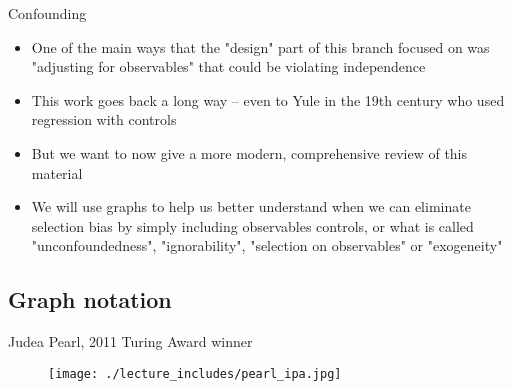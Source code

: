 \documentclass{beamer}
\begin{document}
\begin{frame}{Confounding}

\begin{itemize}

\item One of the main ways that the "design" part of this branch focused on was "adjusting for observables" that could be violating independence
\item This work goes back a long way -- even to Yule in the 19th century who used regression with controls
\item But we want to now give a more modern, comprehensive review of this material
\item We will use graphs to help us better understand when we can eliminate selection bias by simply including observables controls, or what is called "unconfoundedness", "ignorability", "selection on observables" or "exogeneity"

\end{itemize}

\end{frame}



\subsection{Graph notation}

\begin{frame}{Judea Pearl, 2011 Turing Award winner}

  \begin{figure}
    \texttt{[image: ./lecture\_includes/pearl\_ipa.jpg]}
  \end{figure}

\end{frame}
\end{document}

